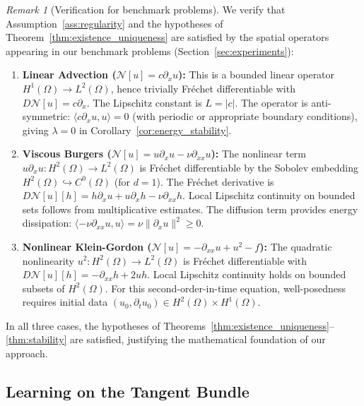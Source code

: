 \documentclass[11pt,reqno]{amsart}
\theoremstyle{plain}
\theoremstyle{definition}
\theoremstyle{remark}
\newtheorem{remark}[theorem]{Remark}
\begin{document}
\begin{remark}[Verification for benchmark problems]\label{rem:benchmark_verification}
We verify that Assumption~\ref{ass:regularity} and the hypotheses of Theorem~\ref{thm:existence_uniqueness} are satisfied by the spatial operators appearing in our benchmark problems (Section~\ref{sec:experiments}):

\begin{enumerate}
    \item \textbf{Linear Advection ($\mathcal{N}[u] = c\partial_x u$):} 
    This is a bounded linear operator $H^1(\Omega) \to L^2(\Omega)$, hence trivially Fréchet differentiable with $D\mathcal{N}[u] = c\partial_x$. The Lipschitz constant is $L = |c|$. The operator is anti-symmetric: $\langle c\partial_x u, u \rangle = 0$ (with periodic or appropriate boundary conditions), giving $\lambda = 0$ in Corollary~\ref{cor:energy_stability}.
    
    \item \textbf{Viscous Burgers ($\mathcal{N}[u] = u\partial_x u - \nu\partial_{xx} u$):} 
    The nonlinear term $u\partial_x u: H^2(\Omega) \to L^2(\Omega)$ is Fréchet differentiable by the Sobolev embedding $H^2(\Omega) \hookrightarrow C^0(\Omega)$ (for $d=1$). The Fréchet derivative is $D\mathcal{N}[u][h] = h\partial_x u + u\partial_x h - \nu\partial_{xx} h$. Local Lipschitz continuity on bounded sets follows from multiplicative estimates. The diffusion term provides energy dissipation: $\langle -\nu\partial_{xx}u, u \rangle = \nu\|\partial_x u\|^2 \geq 0$.
    
    \item \textbf{Nonlinear Klein-Gordon ($\mathcal{N}[u] = -\partial_{xx}u + u^2 - f$):} 
    The quadratic nonlinearity $u^2: H^2(\Omega) \to L^2(\Omega)$ is Fréchet differentiable with $D\mathcal{N}[u][h] = -\partial_{xx}h + 2uh$. Local Lipschitz continuity holds on bounded subsets of $H^2(\Omega)$. For this second-order-in-time equation, well-posedness requires initial data $(u_0, \partial_t u_0) \in H^2(\Omega) \times H^1(\Omega)$.
\end{enumerate}

\noindent In all three cases, the hypotheses of Theorems~\ref{thm:existence_uniqueness}--\ref{thm:stability} are satisfied, justifying the mathematical foundation of our approach.
\end{remark}


\subsection{Learning on the Tangent Bundle}
\end{document}
